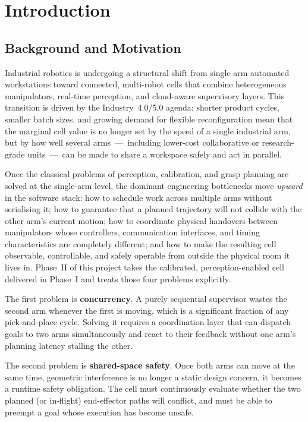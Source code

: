 \chapter{Introduction}
\thispagestyle{fancy}
\vspace*{0cm} %

\section{Background and Motivation}
Industrial robotics is undergoing a structural shift from single-arm automated workstations toward connected, multi-robot cells that combine heterogeneous manipulators, real-time perception, and cloud-aware supervisory layers. This transition is driven by the Industry~4.0/5.0 agenda: shorter product cycles, smaller batch sizes, and growing demand for flexible reconfiguration mean that the marginal cell value is no longer set by the speed of a single industrial arm, but by how well several arms~—~including lower-cost collaborative or research-grade units~—~can be made to share a workspace safely and act in parallel.

Once the classical problems of perception, calibration, and grasp planning are solved at the single-arm level, the dominant engineering bottlenecks move \emph{upward} in the software stack: how to schedule work across multiple arms without serialising it; how to guarantee that a planned trajectory will not collide with the other arm's current motion; how to coordinate physical handovers between manipulators whose controllers, communication interfaces, and timing characteristics are completely different; and how to make the resulting cell observable, controllable, and safely operable from outside the physical room it lives in. Phase~II of this project takes the calibrated, perception-enabled cell delivered in Phase~I and treats those four problems explicitly.

The first problem is \textbf{concurrency}. A purely sequential supervisor wastes the second arm whenever the first is moving, which is a significant fraction of any pick-and-place cycle. Solving it requires a coordination layer that can dispatch goals to two arms simultaneously and react to their feedback without one arm's planning latency stalling the other.

The second problem is \textbf{shared-space safety}. Once both arms can move at the same time, geometric interference is no longer a static design concern, it becomes a runtime safety obligation. The cell must continuously evaluate whether the two planned (or in-flight) end-effector paths will conflict, and must be able to preempt a goal whose execution has become unsafe.


